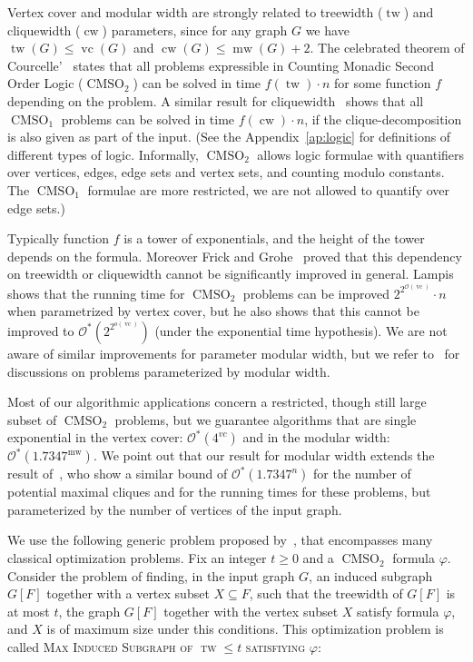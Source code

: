 \documentclass{llncs}
\newcommand{\cO}{\mathcal{O}}
\newcommand{\vc}{\operatorname{vc}}
\newcommand{\tw}{\operatorname{tw}}
\newcommand{\cw}{\operatorname{cw}}
\newcommand{\mw}{\operatorname{mw}}
\newcommand{\pmc}{potential maximal clique}
\newcommand{\cmsot}{\operatorname{CMSO}_2}
\newcommand{\cmsoo}{\operatorname{CMSO}_1}
\newcommand{\pmcb}{1.7347}
\newcommand{\msphit}{\textsc{Max\- Induced\- Subgraph\- of\- $\tw\leq t$\- satisfiying\- $\varphi$}}
\begin{document}
Vertex cover and modular width are strongly related to treewidth ($\tw$) and cliquewidth ($\cw$) parameters, since for any graph $G$ we have $\tw(G) \leq \vc(G)$ and $\cw(G) \leq \mw(G)+2$. The celebrated theorem of Courcelle'~\cite{Courcelle90} states that all problems expressible in Counting Monadic Second Order Logic ($\cmsot$) can be solved in time $f(\tw) \cdot n$ for some function $f$ depending on the problem. A similar result for cliquewidth~\cite{CMR00} shows that all $\cmsoo$ problems can be solved in time $f(\cw) \cdot n$, if the clique-decomposition is also given as part of the input. (See the Appendix~\ref{ap:logic} for definitions of different types of logic. Informally, $\cmsot$ allows logic formulae with quantifiers over vertices, edges, edge sets and vertex sets, and counting modulo constants. The $\cmsoo$ formulae are more restricted, we are not allowed to quantify over edge sets.) 


Typically function $f$ is a tower of exponentials, and the height of the tower depends on the formula. Moreover Frick and Grohe~\cite{FrGr04} proved that this dependency on treewidth or cliquewidth cannot be significantly improved in general. 
Lampis~\cite{Lampis12} shows that the running time for $\cmsot$ problems can be improved $2^{2^{\cO(\vc)}} \cdot n$ when parametrized by vertex cover, but he also shows that this cannot be improved to $\cO^*(2^{2^{o(\vc)}})$ (under the exponential time hypothesis). We are not aware of similar improvements for parameter modular width, but we refer to~\cite{GLO13} for discussions on problems parameterized by modular width. 

Most of our algorithmic applications concern a restricted, though still large subset of $\cmsot$ problems, but we guarantee algorithms that are single exponential in the vertex cover: $\cO^*(4^{vc})$ and in the modular width: $\cO^*(\pmcb^{\mw})$. We point out that our result for modular width extends the result of~\cite{FoVi10,FoToVi14}, who show a similar bound of $\cO^*(\pmcb^n)$ for the number of \pmc s and for the running times for these problems, but parameterized by the number of vertices of the input graph. 


We use the following  generic problem proposed by~\cite{FoToVi14}, that encompasses many classical optimization problems.
Fix an integer $t\geq 0$ and a $\cmsot$ formula $\varphi$. 
Consider the problem of finding, in the input graph $G$, an induced subgraph $G[F]$ together with a vertex subset $X \subseteq F$, such that the treewidth of $G[F]$ is at most $t$, the graph $G[F]$ together with the vertex subset $X$ satisfy formula $\varphi$, and $X$ is of maximum size under this conditions. This optimization problem is called \msphit:
\end{document}
